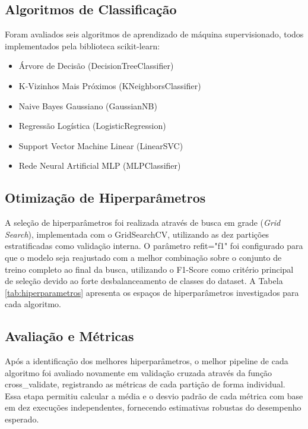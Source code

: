 \subsection{Algoritmos de Classificação}
Foram avaliados seis algoritmos de aprendizado de máquina supervisionado, todos implementados pela biblioteca scikit-learn:
\begin{itemize}
    \item Árvore de Decisão (DecisionTreeClassifier)
    \item K-Vizinhos Mais Próximos (KNeighborsClassifier)
    \item Naive Bayes Gaussiano (GaussianNB)
    \item Regressão Logística (LogisticRegression)
    \item Support Vector Machine Linear (LinearSVC)
    \item Rede Neural Artificial MLP (MLPClassifier)
\end{itemize}

\subsection{Otimização de Hiperparâmetros}
A seleção de hiperparâmetros foi realizada através de busca em grade (\textit{Grid Search}), implementada com o GridSearchCV, utilizando as dez partições estratificadas como validação interna. O parâmetro refit="f1" foi configurado para que o modelo seja reajustado com a melhor combinação sobre o conjunto de treino completo ao final da busca, utilizando o F1-Score como critério principal de seleção devido ao forte desbalanceamento de classes do dataset. A Tabela \ref{tab:hiperparametros} apresenta os espaços de hiperparâmetros investigados para cada algoritmo.



\subsection{Avaliação e Métricas}
Após a identificação dos melhores hiperparâmetros, o melhor pipeline de cada algoritmo foi avaliado novamente em validação cruzada através da função cross\_validate, registrando as métricas de cada partição de forma individual. Essa etapa permitiu calcular a média e o desvio padrão de cada métrica com base em dez execuções independentes, fornecendo estimativas robustas do desempenho esperado. 

